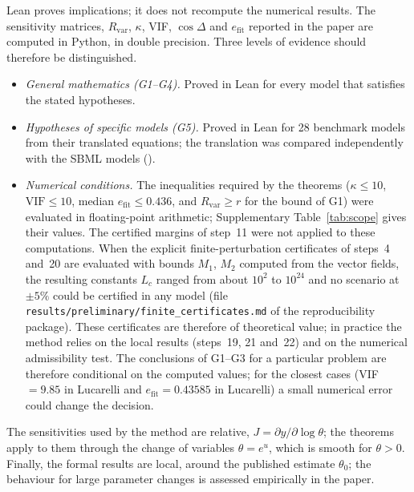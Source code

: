 Lean proves implications; it does not recompute the numerical results. The sensitivity matrices, $R_{\mathrm{var}}$, $\kappa$, VIF, $\cos\Delta$ and $e_{\mathrm{fit}}$ reported in the paper are computed in Python, in double precision. Three levels of evidence should therefore be distinguished.
\begin{itemize}\itemsep0pt
\item \emph{General mathematics (G1--G4).} Proved in Lean for every model that satisfies the stated hypotheses.
\item \emph{Hypotheses of specific models (G5).} Proved in Lean for 28 benchmark models from their translated equations; the translation was compared independently with the SBML models ().
\item \emph{Numerical conditions.} The inequalities required by the theorems ($\kappa\le10$, $\mathrm{VIF}\le10$, median $e_{\mathrm{fit}}\le0.436$, and $R_{\mathrm{var}}\ge r$ for the bound of G1) were evaluated in floating-point arithmetic; Supplementary Table~\ref{tab:scope} gives their values. The certified margins of step~11 were not applied to these computations. When the explicit finite-perturbation certificates of steps~4 and~20 are evaluated with bounds $M_1$, $M_2$ computed from the vector fields, the resulting constants $L_c$ ranged from about $10^2$ to $10^{24}$ and no scenario at $\pm5\%$ could be certified in any model (file \texttt{results/preliminary/finite\_certificates.md} of the reproducibility package). These certificates are therefore of theoretical value; in practice the method relies on the local results (steps~19, 21 and~22) and on the numerical admissibility test. The conclusions of G1--G3 for a particular problem are therefore conditional on the computed values; for the closest cases (VIF $=9.85$ in Lucarelli and $e_{\mathrm{fit}}=0.43585$ in Lucarelli) a small numerical error could change the decision.
\end{itemize}
The sensitivities used by the method are relative, $J=\partial y/\partial\log\theta$; the theorems apply to them through the change of variables $\theta=e^{u}$, which is smooth for $\theta>0$. Finally, the formal results are local, around the published estimate $\theta_0$; the behaviour for large parameter changes is assessed empirically in the paper.
\fussy
